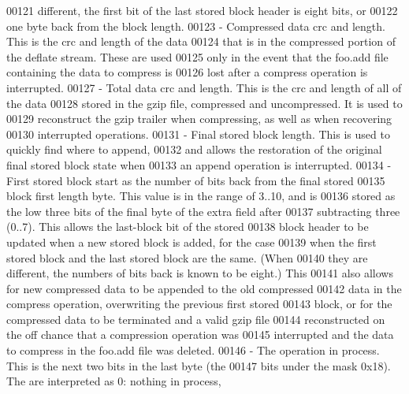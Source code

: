 \begin{DoxyCode}
00121 \textcolor{comment}{     different, the first bit of the last stored block header is eight bits, or}
00122 \textcolor{comment}{     one byte back from the block length.}
00123 \textcolor{comment}{   - Compressed data crc and length.  This is the crc and length of the data}
00124 \textcolor{comment}{     that is in the compressed portion of the deflate stream.  These are used}
00125 \textcolor{comment}{     only in the event that the foo.add file containing the data to compress is}
00126 \textcolor{comment}{     lost after a compress operation is interrupted.}
00127 \textcolor{comment}{   - Total data crc and length.  This is the crc and length of all of the data}
00128 \textcolor{comment}{     stored in the gzip file, compressed and uncompressed.  It is used to}
00129 \textcolor{comment}{     reconstruct the gzip trailer when compressing, as well as when recovering}
00130 \textcolor{comment}{     interrupted operations.}
00131 \textcolor{comment}{   - Final stored block length.  This is used to quickly find where to append,}
00132 \textcolor{comment}{     and allows the restoration of the original final stored block state when}
00133 \textcolor{comment}{     an append operation is interrupted.}
00134 \textcolor{comment}{   - First stored block start as the number of bits back from the final stored}
00135 \textcolor{comment}{     block first length byte.  This value is in the range of 3..10, and is}
00136 \textcolor{comment}{     stored as the low three bits of the final byte of the extra field after}
00137 \textcolor{comment}{     subtracting three (0..7).  This allows the last-block bit of the stored}
00138 \textcolor{comment}{     block header to be updated when a new stored block is added, for the case}
00139 \textcolor{comment}{     when the first stored block and the last stored block are the same.  (When}
00140 \textcolor{comment}{     they are different, the numbers of bits back is known to be eight.)  This}
00141 \textcolor{comment}{     also allows for new compressed data to be appended to the old compressed}
00142 \textcolor{comment}{     data in the compress operation, overwriting the previous first stored}
00143 \textcolor{comment}{     block, or for the compressed data to be terminated and a valid gzip file}
00144 \textcolor{comment}{     reconstructed on the off chance that a compression operation was}
00145 \textcolor{comment}{     interrupted and the data to compress in the foo.add file was deleted.}
00146 \textcolor{comment}{   - The operation in process.  This is the next two bits in the last byte (the}
00147 \textcolor{comment}{     bits under the mask 0x18).  The are interpreted as 0: nothing in process,}

\end{DoxyCode}
